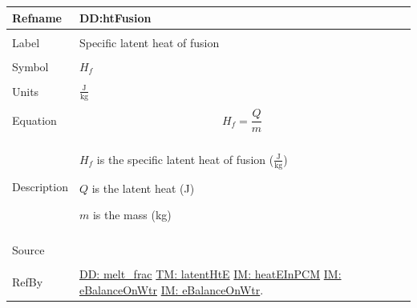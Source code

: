 \documentclass[12pt]{article}
\begin{document}
 \noindent \begin{minipage}{\textwidth}
\begin{tabular}{p{} p{}}
\toprule \textbf{Refname} & \textbf{DD:htFusion}
\label{DD:htFusion}
\\ \midrule \\
Label & Specific latent heat of fusion
        \\ \midrule \\
        Symbol & ${H_{f}}$
                 \\ \midrule \\
                 Units & $\frac{\text{J}}{\text{kg}}$
                         \\ \midrule \\
                         Equation & \begin{dmath}
                                    {H_{f}}=\frac{Q}{m}
                                    \end{dmath}
                                    \\ \midrule \\
                                    Description & \begin{symbDescription}
                                                  \item{${H_{f}}$ is the specific latent heat of fusion ($\frac{\text{J}}{\text{kg}}$)}
                                                  \item{$Q$ is the latent heat (J)}
                                                  \item{$m$ is the mass (kg)}
                                                  \end{symbDescription}
                                                  \\ \midrule \\
                                                  Source & \cite{bueche1986}
                                                           \\ \midrule \\
                                                           RefBy & \hyperref[DD:melt.frac]{DD: melt\_frac} \hyperref[TM:latentHtE]{TM: latentHtE} \hyperref[IM:heatEInPCM]{IM: heatEInPCM} \hyperref[IM:eBalanceOnWtr]{IM: eBalanceOnWtr} \hyperref[IM:eBalanceOnWtr]{IM: eBalanceOnWtr}.
\\ \bottomrule \end{tabular}
\end{minipage}\\
\end{document}
